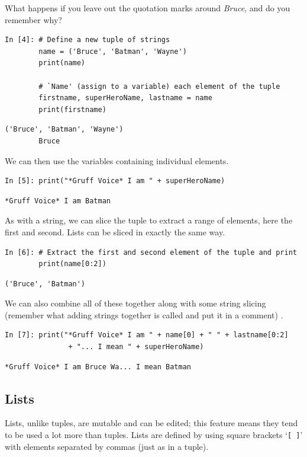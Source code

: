 \noindent What happens if you leave out the quotation marks around \textit{Bruce}, and do you remember why?
\begin{lstlisting}[style=PY] 
In [4]: # Define a new tuple of strings
        name = ('Bruce', 'Batman', 'Wayne')
        print(name)
        
        # `Name' (assign to a variable) each element of the tuple
        firstname, superHeroName, lastname = name
        print(firstname)
\end{lstlisting}
\begin{lstlisting}[style=PY_out]
        ('Bruce', 'Batman', 'Wayne')
        Bruce
\end{lstlisting}
We can then use the variables containing individual elements.
\begin{lstlisting}[style=PY]
In [5]: print("*Gruff Voice* I am " + superHeroName)
\end{lstlisting}
\begin{lstlisting}[style=PY_out]
        *Gruff Voice* I am Batman
\end{lstlisting}
As with a string, we can slice the tuple to extract a range of elements, here the first and second. Lists can be sliced in exactly the same way.
\begin{lstlisting}[style=PY]
In [6]: # Extract the first and second element of the tuple and print
        print(name[0:2])
\end{lstlisting}
\begin{lstlisting}[style=PY_out]
        ('Bruce', 'Batman')
\end{lstlisting}
We can also combine all of these together along with some string slicing (remember what adding strings together is called and put it in a comment) .
\begin{lstlisting}[style=PY]
In [7]: print("*Gruff Voice* I am " + name[0] + " " + lastname[0:2] 
               + "... I mean " + superHeroName)
\end{lstlisting}
\begin{lstlisting}[style=PY_out]
        *Gruff Voice* I am Bruce Wa... I mean Batman
\end{lstlisting}

\newpage

\subsection{Lists}
\label{sec:lists}
\noindent Lists, unlike tuples, are mutable and can be edited; this feature means they tend to be used a lot more than tuples. Lists are defined by using square brackets `\texttt{[ ]}' with elements separated by commas (just as in a tuple).\\

